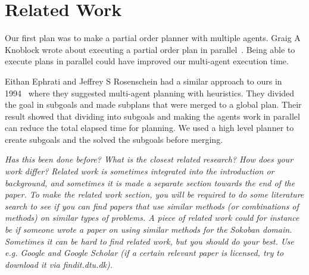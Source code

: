 \section{Related Work}
\label{sec:related work}
Our first plan was to make a partial order planner with multiple agents.
Graig A Knoblock wrote about executing a partial order plan in parallel~\cite{knoblock1994generating}.
Being able to execute plans in parallel could have improved our multi-agent execution time.

Eithan Ephrati and Jeffrey S Rosenschein had a similar approach to ours in 1994~\cite{ephrati1994divide} where they suggested multi-agent planning with heuristics.
They divided the goal in subgoals and made subplans that were merged to a global plan.
Their result showed that dividing into subgoals and making the agents work in parallel can reduce the total elapsed time for planning.
We used a high level planner to create subgoals and the solved the subgoals before merging.


\emph{Has this been done before? What is the closest related research? How does your work differ? Related work is sometimes integrated into the introduction or background, and sometimes it is made a separate section towards the end of the paper.  To make the related work section, you will be required to do some literature search to see if you can find papers that use similar methods (or combinations of methods) on similar types of problems. A piece of related work could for instance be if someone wrote a paper on using similar methods for the Sokoban domain. Sometimes it can be hard to find related work, but you should do your best. Use e.g. Google and Google Scholar (if a certain relevant paper is licensed, try to download it via findit.dtu.dk).}


